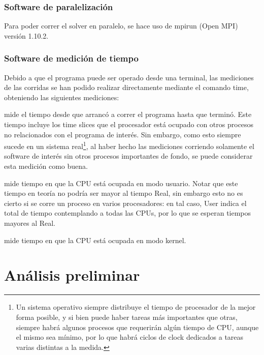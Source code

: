 \documentclass{article}
\begin{document}
\subsubsection{Software de paralelización}
Para poder correr el solver en paralelo, se hace uso de mpirun (Open MPI) versión 1.10.2. 

\subsubsection{Software de medición de tiempo}
Debido a que el programa puede ser operado desde una terminal, las mediciones de las corridas se han podido realizar directamente mediante el comando time, obteniendo las siguientes mediciones: 
\begin{description}[align=left]
    \item [Real:] mide el tiempo desde que arrancó a correr el programa hasta que terminó. Este tiempo incluye los time slices que el procesador está ocupado con otros procesos no relacionados con el programa de interés. Sin embargo, como esto siempre sucede en un sistema real\footnote{ Un sistema operativo siempre distribuye el tiempo de procesador de la mejor forma posible, y si bien puede haber tareas más importantes que otras, siempre habrá algunos procesos que requerirán algún tiempo de CPU, aunque el mismo sea mínimo, por lo que habrá ciclos de clock dedicados a tareas varias distintas a la medida.}, al haber hecho las mediciones corriendo solamente el software de interés sin otros procesos importantes de fondo, se puede considerar esta medición como buena.
    \item [User:] mide tiempo en que la CPU está ocupada en modo usuario. Notar que este tiempo en teoría no podría ser mayor al tiempo Real, sin embargo esto no es cierto si se corre un proceso en varios procesadores: en tal caso, User indica el total de tiempo contemplando a todas las CPUs, por lo que se esperan tiempos mayores al Real.
    \item [Sys:] mide tiempo en que la CPU está ocupada en modo kernel.
\end{description}

\newpage
\section{Análisis preliminar}
\end{document}
